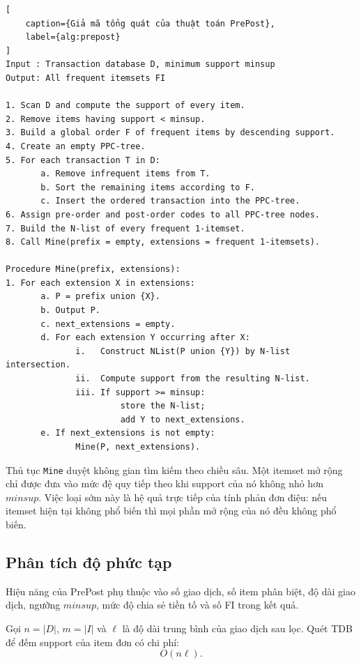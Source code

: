 \begin{lstlisting}[
    caption={Giả mã tổng quát của thuật toán PrePost},
    label={alg:prepost}
]
Input : Transaction database D, minimum support minsup
Output: All frequent itemsets FI

1. Scan D and compute the support of every item.
2. Remove items having support < minsup.
3. Build a global order F of frequent items by descending support.
4. Create an empty PPC-tree.
5. For each transaction T in D:
       a. Remove infrequent items from T.
       b. Sort the remaining items according to F.
       c. Insert the ordered transaction into the PPC-tree.
6. Assign pre-order and post-order codes to all PPC-tree nodes.
7. Build the N-list of every frequent 1-itemset.
8. Call Mine(prefix = empty, extensions = frequent 1-itemsets).

Procedure Mine(prefix, extensions):
1. For each extension X in extensions:
       a. P = prefix union {X}.
       b. Output P.
       c. next_extensions = empty.
       d. For each extension Y occurring after X:
              i.   Construct NList(P union {Y}) by N-list intersection.
              ii.  Compute support from the resulting N-list.
              iii. If support >= minsup:
                       store the N-list;
                       add Y to next_extensions.
       e. If next_extensions is not empty:
              Mine(P, next_extensions).
\end{lstlisting}

Thủ tục \texttt{Mine} duyệt không gian tìm kiếm theo chiều sâu. Một itemset mở
rộng chỉ được đưa vào mức đệ quy tiếp theo khi support của nó không nhỏ hơn
$\mathit{minsup}$. Việc loại sớm này là hệ quả trực tiếp của tính phản đơn điệu:
nếu itemset hiện tại không phổ biến thì mọi phần mở rộng của nó đều không phổ
biến.

\subsection{Phân tích độ phức tạp}

Hiệu năng của PrePost phụ thuộc vào số giao dịch, số item phân biệt, độ dài giao
dịch, ngưỡng $\mathit{minsup}$, mức độ chia sẻ tiền tố và số FI trong kết quả.

Gọi $n=|D|$, $m=|I|$ và $\ell$ là độ dài trung bình của giao dịch sau lọc.
Quét TDB để đếm support của item đơn có chi phí:
\begin{equation}
    O(n\ell).
    \label{eq:scan-complexity}
\end{equation}

